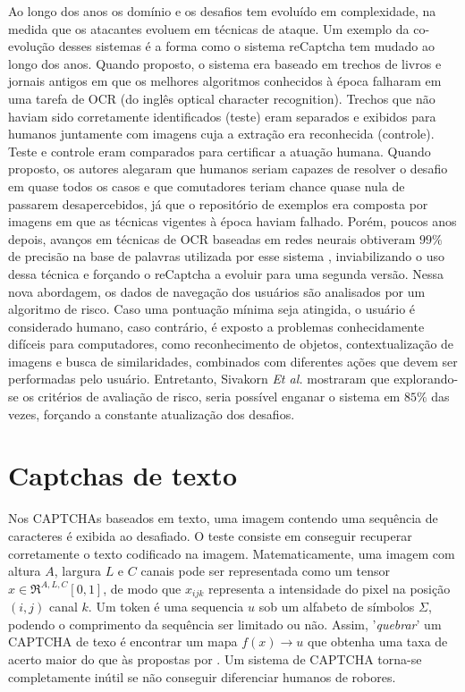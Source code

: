 Ao longo dos anos os domínio e os desafios tem evoluído em complexidade, na medida que os atacantes evoluem em técnicas de ataque. Um exemplo da co-evolução desses sistemas é a forma como o sistema reCaptcha \cite{recaptcha1} tem mudado ao longo dos anos. Quando proposto, o sistema era baseado em trechos de livros e jornais antigos em que os melhores algoritmos conhecidos à época falharam em uma tarefa de OCR (do inglês optical character recognition). Trechos que não haviam sido corretamente identificados (teste) eram separados e exibidos para humanos juntamente com imagens cuja a extração era reconhecida (controle). Teste e controle eram comparados para certificar a atuação humana. Quando proposto, os autores alegaram que humanos seriam capazes de resolver o desafio em quase todos os casos e que comutadores teriam chance quase nula de passarem desapercebidos, já que o repositório de exemplos era composta por imagens em que as técnicas vigentes à época haviam falhado. Porém, poucos anos depois, avanços em técnicas de OCR baseadas em redes neurais obtiveram $99\%$ de precisão na base de palavras utilizada por esse sistema \cite{captcha_break_2013}, inviabilizando o uso dessa técnica e forçando o reCaptcha a evoluir para uma segunda versão. Nessa nova abordagem, os dados de navegação dos usuários são analisados por um algoritmo de risco. Caso uma pontuação mínima seja atingida, o usuário é considerado humano, caso contrário, é exposto a problemas conhecidamente difíceis para computadores, como reconhecimento de objetos, contextualização de imagens e busca de similaridades, combinados com diferentes ações que devem ser performadas pelo usuário. Entretanto, Sivakorn \textit{Et al.} \cite{imarobot} mostraram que explorando-se os critérios de avaliação de risco, seria possível enganar o sistema em $85\%$ das vezes, forçando a constante atualização dos desafios.

\section{Captchas de texto}\label{sec:captchatexto}

Nos CAPTCHAs baseados em texto, uma imagem contendo uma sequência de caracteres é exibida ao desafiado. O teste consiste em conseguir recuperar corretamente o texto codificado na imagem. Matematicamente, uma imagem com altura $A$, largura $L$ e $C$ canais pode ser representada como um tensor $x \in \Re^{A,L,C}[0,1]$, de modo que  $x_{ijk}$ representa a intensidade do pixel na posição $(i,j)$ canal $k$. Um token é uma sequencia $u$ sob um alfabeto de símbolos $\Sigma$, podendo o comprimento da sequência ser limitado ou não. Assim, '\textit{quebrar}' um CAPTCHA de texo é encontrar um mapa $f(x) \rightarrow u$ que obtenha uma taxa de acerto maior do que às propostas por \cite{lectures2005HIP}. Um sistema de CAPTCHA torna-se completamente inútil se não conseguir diferenciar humanos de robores.

